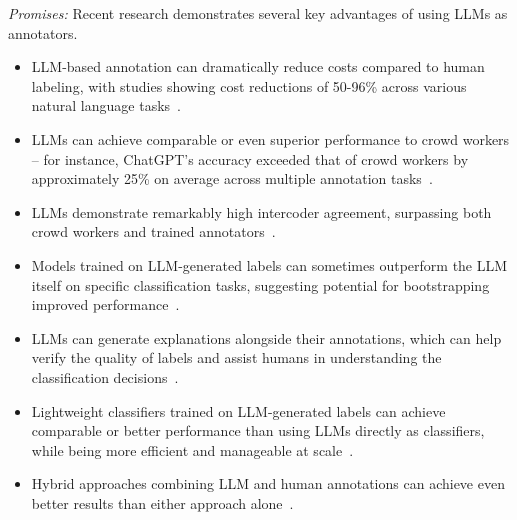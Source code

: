 \documentclass[11pt]{article}
\begin{document}
\emph{Promises:} Recent research demonstrates several key advantages of using LLMs as annotators. 
\begin{itemize}
    \item  LLM-based annotation can dramatically reduce costs compared to human labeling, with studies showing cost reductions of 50-96\% across various natural language tasks~\cite{DBLP:conf/emnlp/WangLXZZ21}. 
    \item LLMs can achieve comparable or even superior performance to crowd workers -- for instance, ChatGPT's accuracy exceeded that of crowd workers by approximately 25\% on average across multiple annotation tasks~\cite{DBLP:journals/corr/abs-2303-15056}. 
    \item LLMs demonstrate remarkably high intercoder agreement, surpassing both crowd workers and trained annotators~\cite{DBLP:journals/corr/abs-2303-15056}. 
    \item Models trained on LLM-generated labels can sometimes outperform the LLM itself on specific classification tasks, suggesting potential for bootstrapping improved performance~\cite{DBLP:conf/emnlp/WangLXZZ21}. 
    \item LLMs can generate explanations alongside their annotations, which can help verify the quality of labels and assist humans in understanding the classification decisions~\cite{DBLP:conf/chi/Wang0RMM24}. 
    \item Lightweight classifiers trained on LLM-generated labels can achieve comparable or better performance than using LLMs directly as classifiers, while being more efficient and manageable at scale~\cite{DBLP:conf/kdd/WanSJKCNSSWYABJ24}. 
    \item Hybrid approaches combining LLM and human annotations can achieve even better results than either approach alone~\cite{DBLP:conf/emnlp/WangLXZZ21}.
\end{itemize}
\end{document}
